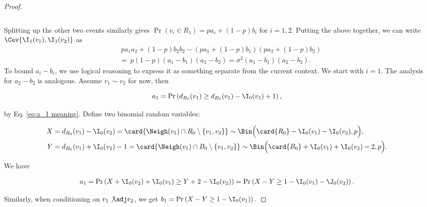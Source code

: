 \documentclass{toc}
\begin{document}
\begin{proof}
\begin{linenomath}
\begin{equation*}
				\end{equation*}\end{linenomath}
				Splitting up the other two events similarly gives
				$\Pr\left(v_i \in R_1\right) =  pa_i + (1 - p)b_i$
				for $i = 1, 2$.
				Putting the above together, we can write $\Cov{\I_1(v_1), \I_1(v_2)}$ as
				\begin{equation} \label{eq:temp34}
					\begin{aligned}
						\ & \ pa_1a_2 + (1 - p)b_2b_2 - \left(pa_1 + (1 - p)b_1\right) \left(pa_2 + (1 - p)b_2 \right) \\
						\ & = \ p(1 - p)(a_1 - b_1)(a_2 - b_2) = \sigma^2(a_1 - b_1)(a_2 - b_2).
					\end{aligned}
				\end{equation}
				To bound $a_i - b_i$, we use logical reasoning to express it as something separate from the current context.
				We start with $i = 1$. The analysis for $a_2 - b_2$ is analogous.
				Assume  %
				$v_1 \sim v_2$ for now, then
				\begin{linenomath}\begin{equation*}
						a_1 = \Pr\left(d_{R_0}(v_1) \ge d_{B_0}(v_1) - \I_0(v_1) + 1\right),
				\end{equation*}\end{linenomath}
				by Eq. \eqref{eq:a_1 meaning}.
				Define two binomial random variables:
				\begin{linenomath}\begin{equation*}
						\begin{aligned}
							X & = d_{R_0}(v_1) - \I_0(v_2) = \card{\Neigh(v_1)\cap  R_0\setminus \{v_1, v_2\}} 
							\sim \Bin\Bigl(\card{R_0} - \I_0(v_1) - \I_0(v_2), p\Bigr), \\
							Y & = d_{B_0}(v_1) + \I_0(v_2) - 1 = \card{\Neigh(v_1)\cap B_0\setminus \{v_1, v_2\}}
							\sim \Bin\Bigl(\card{B_0} + \I_0(v_1) + \I_0(v_2) - 2, p\Bigr).
						\end{aligned}
				\end{equation*}\end{linenomath}
				We have
				\begin{linenomath}\begin{equation*}
						\begin{aligned}
							a_1 = \Pr\left(X + \I_0(v_2) + \I_0(v_1) \ge Y + 2 - \I_0(v_2)\right)
							= \Pr\left(X - Y \ge 1 - \I_0(v_1) - \J_0(v_2)\right).
						\end{aligned}
				\end{equation*}\end{linenomath}
				Similarly, when conditioning on $v_1\not\adj v_2$, we get
				$
				b_1 = \Pr\left(X - Y \ge 1 - \I_0(v_1)\right).
				$
				

\end{proof}
\end{document}
